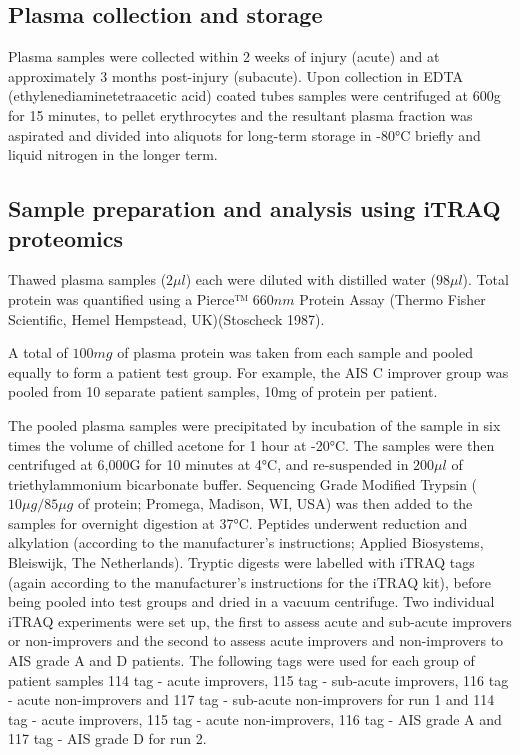 \documentclass[
]{article}
\begin{document}
\hypertarget{plasma-collection-and-storage}{%
\subsection{Plasma collection and storage}\label{plasma-collection-and-storage}}

Plasma samples were collected within 2 weeks of injury (acute) and at approximately 3 months post-injury (subacute).
Upon collection in EDTA (ethylenediaminetetraacetic acid) coated tubes samples were centrifuged at 600g for 15 minutes, to pellet erythrocytes and the resultant plasma fraction was aspirated and divided into aliquots for long-term storage in -80°C briefly and liquid nitrogen in the longer term.

\hypertarget{itraq-sample-prep}{%
\subsection{Sample preparation and analysis using iTRAQ proteomics}\label{itraq-sample-prep}}

Thawed plasma samples (\(2\mu l\)) each were diluted with distilled water (\(98\mu l\)).
Total protein was quantified using a Pierce™ \(660 nm\) Protein Assay (Thermo Fisher Scientific, Hemel Hempstead, UK)(Stoscheck 1987).

A total of \(100 mg\) of plasma protein was taken from each sample and pooled equally to form a patient test group.
For example, the AIS C improver group was pooled from 10 separate patient samples, 10mg of protein per patient.

The pooled plasma samples were precipitated by incubation of the sample in six times the volume of chilled acetone for 1 hour at -20°C.
The samples were then centrifuged at 6,000G for 10 minutes at 4°C, and re-suspended in \(200\mu l\) of triethylammonium bicarbonate buffer.
Sequencing Grade Modified Trypsin (\(10\mu g/85\mu g\) of protein; Promega, Madison, WI, USA) was then added to the samples for overnight digestion at 37°C.
Peptides underwent reduction and alkylation (according to the manufacturer's instructions; Applied Biosystems, Bleiswijk, The Netherlands).
Tryptic digests were labelled with iTRAQ tags (again according to the manufacturer's instructions for the iTRAQ kit), before being pooled into test groups and dried in a vacuum centrifuge.
Two individual iTRAQ experiments were set up, the first to assess acute and sub-acute improvers or non-improvers and the second to assess acute improvers and non-improvers to AIS grade A and D patients.
The following tags were used for each group of patient samples 114 tag - acute improvers, 115 tag - sub-acute improvers, 116 tag - acute non-improvers and 117 tag - sub-acute non-improvers for run 1 and 114 tag - acute improvers, 115 tag - acute non-improvers, 116 tag - AIS grade A and 117 tag - AIS grade D for run 2.
\end{document}
